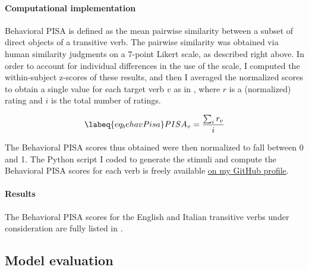 \paragraph{Computational implementation} Behavioral PISA is defined as the mean pairwise similarity between a subset of direct objects of a transitive verb. The pairwise similarity was obtained via human similarity judgments on a 7-point Likert scale, as described right above. In order to account for individual differences in the use of the scale, I computed the within-subject z-scores of these results, and then I averaged the normalized scores to obtain a single value for each target verb $v$ \parencite{KimEtAl2018, KimEtAl2019, KimEtAl2019a} as in , where $r$ is a (normalized) rating and $i$ is the total number of ratings.

\begin{equation} \labeq{eq_behavPisa}
PISA_{v} = \frac{\sum_{i} r_{v}}{i}
\end{equation}

The Behavioral PISA scores thus obtained were then normalized to fall between 0 and 1. The Python script I coded to generate the stimuli and compute the Behavioral PISA scores for each verb is freely available \href{https://github.com/giuliacappelli/behavioralPISA}{on my GitHub profile}.

\paragraph{Results} 
The Behavioral PISA scores for the English and Italian transitive verbs under consideration are fully listed in .


\subsection{Model evaluation} 

